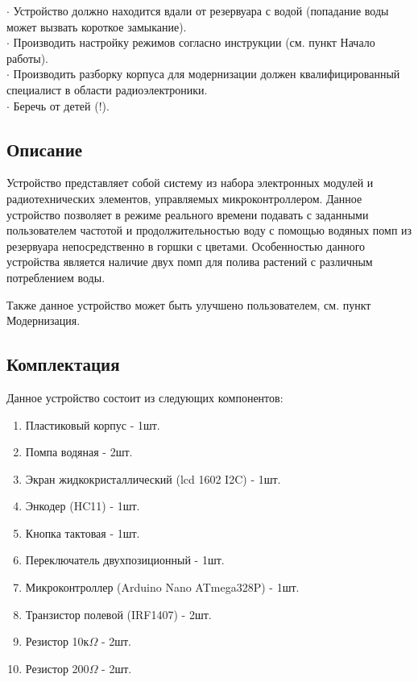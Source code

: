 \documentclass[12pt]{article}
\begin{document}
	$\cdot$ Устройство должно находится вдали от резервуара с водой (попадание воды может вызвать короткое замыкание).\\
	
	$\cdot$ Производить настройку режимов согласно инструкции (см. пункт Начало работы).\\
	
	$\cdot$ Производить разборку корпуса для модернизации должен квалифицированный специалист в области радиоэлектроники.\\
	
	$\cdot$ Беречь от детей (!).\\
	
	\subsection{Описание}
	
	Устройство представляет собой систему из набора электронных модулей и радиотехнических элементов, управляемых микроконтроллером. Данное устройство позволяет в режиме реального времени подавать с заданными пользователем частотой и продолжительностью воду с помощью водяных помп из резервуара непосредственно в горшки с цветами. Особенностью данного устройства является наличие двух помп для полива растений с различным потреблением воды.
	
	Также данное устройство может быть улучшено пользователем, см. пункт Модернизация.
	
	\subsection{Комплектация}
	Данное устройство состоит из следующих компонентов:
	\begin{enumerate}
		\item Пластиковый корпус - 1шт.
		\item Помпа водяная - 2шт.
		\item Экран жидкокристаллический (lcd 1602 I2C) - 1шт.
		\item Энкодер (HC11) - 1шт.
		\item Кнопка тактовая - 1шт.
		\item Переключатель двухпозиционный - 1шт.
		\item Микроконтроллер (Arduino Nano ATmega328P) - 1шт.
		\item Транзистор полевой (IRF1407) - 2шт.
		\item Резистор 10к$\Omega$ - 2шт.
		\item Резистор 200$\Omega$ - 2шт.
	\end{enumerate}
	
\end{document}
